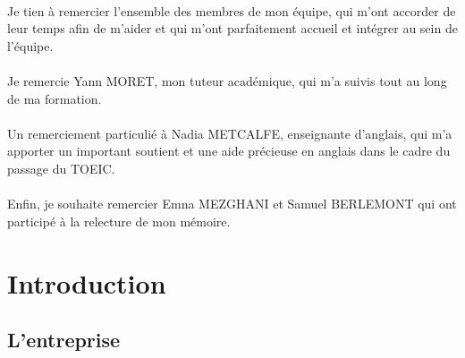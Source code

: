 \documentclass[12pt,a4paper]{report}
\begin{document}
\paragraph*{}Je tien à remercier l'ensemble des membres de mon équipe, qui m'ont accorder de leur temps afin de m'aider et qui m'ont parfaitement accueil et intégrer au sein de l'équipe. 
\paragraph*{}Je remercie Yann MORET, mon tuteur académique, qui m'a suivis tout au long de ma formation. 
\paragraph*{}Un remerciement particulié à Nadia METCALFE, enseignante d'anglais, qui m'a apporter un important soutient et une aide précieuse en anglais dans le cadre du passage du TOEIC.
\paragraph*{}Enfin, je souhaite remercier Emna MEZGHANI et Samuel BERLEMONT qui ont participé à la relecture de mon mémoire.

\newpage
\section{Introduction}
\subsection{L'entreprise}
\end{document}
